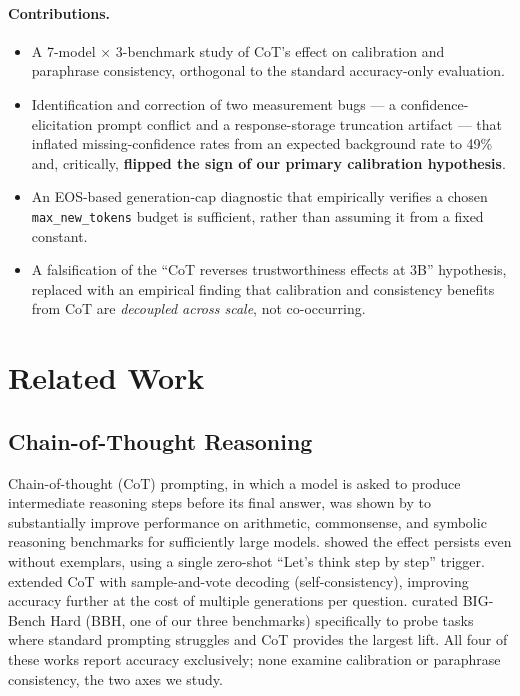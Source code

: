 \documentclass{article}
\begin{document}
\paragraph{Contributions.}
\begin{itemize}
    \item A 7-model $\times$ 3-benchmark study of CoT's effect on calibration and paraphrase consistency, orthogonal to the standard accuracy-only evaluation.
    \item Identification and correction of two measurement bugs --- a confidence-elicitation prompt conflict and a response-storage truncation artifact --- that inflated missing-confidence rates from an expected background rate to 49\% and, critically, \textbf{flipped the sign of our primary calibration hypothesis}.
    \item An EOS-based generation-cap diagnostic that empirically verifies a chosen \texttt{max\_new\_tokens} budget is sufficient, rather than assuming it from a fixed constant.
    \item A falsification of the ``CoT reverses trustworthiness effects at 3B'' hypothesis, replaced with an empirical finding that calibration and consistency benefits from CoT are \emph{decoupled across scale}, not co-occurring.
\end{itemize}

\section{Related Work}
\label{sec:related}

\subsection{Chain-of-Thought Reasoning}

Chain-of-thought (CoT) prompting, in which a model is asked to produce intermediate reasoning steps before its final answer, was shown by \citet{wei2022chain} to substantially improve performance on arithmetic, commonsense, and symbolic reasoning benchmarks for sufficiently large models. \citet{kojima2022zeroshot} showed the effect persists even without exemplars, using a single zero-shot ``Let's think step by step'' trigger. \citet{wang2023selfconsistency} extended CoT with sample-and-vote decoding (self-consistency), improving accuracy further at the cost of multiple generations per question. \citet{suzgun2023bbh} curated BIG-Bench Hard (BBH, one of our three benchmarks) specifically to probe tasks where standard prompting struggles and CoT provides the largest lift. All four of these works report accuracy exclusively; none examine calibration or paraphrase consistency, the two axes we study.
\end{document}
